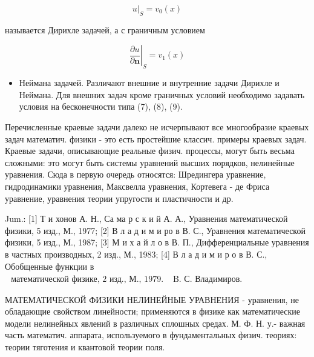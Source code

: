 \documentclass[10pt]{article}
\begin{document}
\[

\left.u\right|_{S}=v_{0}(x)

\]



называется Дирихле задачей, а с граничным условием



\[

\left.\frac{\partial u}{\partial \boldsymbol{n}}\right|_{S}=v_{1}(x)

\]



\begin{itemize}

  \item Неймана задачей. Различают внешние и внутренние задачи Дирихле и Неймана. Для внешних задач кроме граничных условий необходимо задавать условия на бесконечности типа (7), (8), (9).

\end{itemize}



Перечисленные краевые задачи далеко не исчерпывают все многообразие краевых задач математич. физики - это есть простейшие классич. примеры краевых задач. Краевые задачи, описывающие реальные физич. процессы, могут быть весьма сложными: это могут быть системы уравнений высших порядков, нелинейные уравнения. Сюда в первую очередь относятся: Шредингера уравнение, гидродинамики уравнения, Максвелла уравнения, Кортевега - де Фриса уравнение, уравнения теории упругости и пластичности и др.



Jum.: [1] Т и хонов А. Н., Са ма р с к и й А. А., Уравнения математической физики, 5 изд., М., 1977; [2] В л а д и м и ро в В. С., Уравнения математической физики, 5 изд., М., 1987; [3] М и х а й л о в В. П., Дифференциальные уравнения в частных производных, 2 изд., М., 1983; [4] В л а д и м и р о в В. С., Обобщенные функции в $\begin{array}{ll}\text { математической физике, } 2 \text { изд., М., } 1979 . & \text { B. С. Владимиров. }\end{array}$



МАТЕМАТИЧЕСКОЙ ФИЗИКИ НЕЛИНЕЙНЫЕ УРАВНЕНИЯ - уравнения, не обладающие свойством линейности; применяются в физике как математические модели нелинейных явлений в различных сплошных средах. М. Ф. Н. у.- важная часть математич. аппарата, используемого в фундаментальных физич. теориях: теории тяготения и квантовой теории поля.
\end{document}
